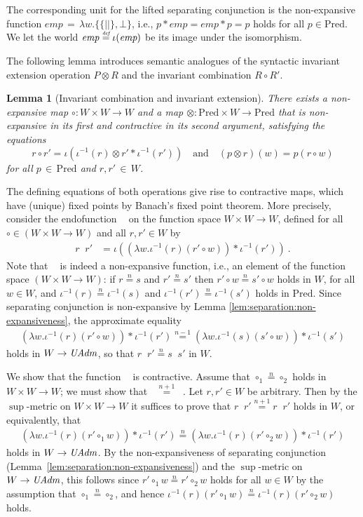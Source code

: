 \documentclass{LMCS}
\newtheorem{lemma}[theorem]{Lemma}
\theoremstyle{remark}
\newcommand{\defeq}{\ensuremath{\stackrel{\mbox{\tiny \it def}}{=}}}
\newcommand{\record}[1]{\ensuremath{\left.\!\{\!|{#1}|\!\}\right.\!}}
\newcommand{\EMP}{\ensuremath{\textit{emp}}}
\newcommand{\wemp}{\textnormal{\textit{emp}}}
\newcommand{\Pred}{\ensuremath{\mathrm{Pred}}\xspace}
\newcommand{\W}{\ensuremath{W}}
\newcommand{\FOLD}{\ensuremath{\iota}}
\newcommand{\UNFOLD}{\ensuremath{\iota^{-1}}}
\newcommand{\nequiv}[1]{\ensuremath{\mathrel{\stackrel{#1}{=}}}}
\newcommand{\PHI}[1]{\ensuremath{\mathop{\overline{#1}}}}
\begin{document}
The corresponding unit for the lifted separating conjunction   is the non-expansive function $\EMP \,{=}\,\lambda w.\{\record{},\bot\}$, i.e., $p * \EMP =\EMP * p = p$ holds for all $p\in\Pred$.
We let the world $\wemp \defeq \FOLD(\EMP)$ be its image under the isomorphism. 

The following lemma introduces semantic analogues of the syntactic invariant extension operation $P\otimes R$ and the invariant combination $R\circ R'$. 

\begin{lemma}
[Invariant combination and invariant extension] 
\label{lem:existence-tensor-and-circ}
There exists a non-expansive map $\circ : W\times W\to W$  and a map 
$\otimes : \Pred\times W \to\Pred$ 
that is non-expansive in its first and contractive in its second argument, satisfying the equations
\[
r\circ r' = \FOLD(\UNFOLD(r)\otimes r' *\UNFOLD(r'))
\quad \text{and}\quad
(p\otimes r)(w) =  p(r\circ w)\] 
for all $p\,{\in}\,\Pred$ and $r,r'\,{\in}\,\W$.
\end{lemma}
\proof
The defining equations of both operations give rise to contractive maps, which have (unique) fixed points by Banach's fixed point theorem. 
More precisely, consider the endofunction $\PHI\cdot$ on the  function  space $W\times W\to W$, defined for all $\circ\in(W\times W\to W)$ and all $r,r'\in\W$ by 
\begin{align*}
r \PHI{\circ} r' &= \FOLD((\lambda w.\UNFOLD(r)(r'\circ w)) * \UNFOLD(r'))\ .
\end{align*}
Note that $\PHI{\circ}$ is indeed a non-expansive function, i.e., an element of the function space $(W\times W\to W)$: 
if $r\nequiv n s$ and $r'\nequiv n s'$ then $r'\circ w\nequiv n s'\circ w$ holds in $W$, for all $w\in\W$, and $\UNFOLD (r)\nequiv n \UNFOLD(s)$ and $\UNFOLD (r')\nequiv n \UNFOLD(s')$   holds in $\Pred$. Since separating conjunction is non-expansive by Lemma \ref{lem:separation:non-expansiveness}, the approximate equality
\begin{align*}
(\lambda w.\UNFOLD(r)(r'\circ w)) * \UNFOLD(r')
\nequiv{n-1}
(\lambda w.\UNFOLD(s)(s'\circ w)) * \UNFOLD(s')
\end{align*}
holds in $\W\to\UAdm$, so that $r\PHI{\circ}r' \nequiv n s\PHI\circ s'$ in $\W$. 

We show that the function $\PHI\cdot$ is contractive. Assume that $\circ_1\nequiv n\circ_2$ holds in $W\times W\to W$; we must show that $\PHI{\circ_1}\nequiv {n+1}\PHI{\circ_2}$. Let $r,r'\in\W$ be arbitrary. Then by the $\sup$-metric on $\W\times \W\to\W$ it suffices to prove that $r\PHI{\circ_1}r' \nequiv {n+1} r\PHI{\circ_2} r'$ holds in $\W$, or equivalently, that 
\begin{align*}
(\lambda w.\UNFOLD(r)(r'\circ_1 w)) * \UNFOLD(r')
\nequiv{n}
(\lambda w.\UNFOLD(r)(r'\circ_2 w)) * \UNFOLD(r')
\end{align*}
holds in $\W\to\UAdm$. 
By the non-expansiveness of separating conjunction (Lemma~\ref{lem:separation:non-expansiveness}) and the $\sup$-metric on $\W\to\UAdm$, this follows since $r'\circ_1 w\nequiv n r'\circ_2 w$ holds for all $w\in\W$ by the assumption that $\circ_1\nequiv n\circ_2$, and hence $\UNFOLD(r)(r'\circ_1 w)\nequiv n\UNFOLD(r)(r'\circ_2 w)$  holds. 
\end{document}
